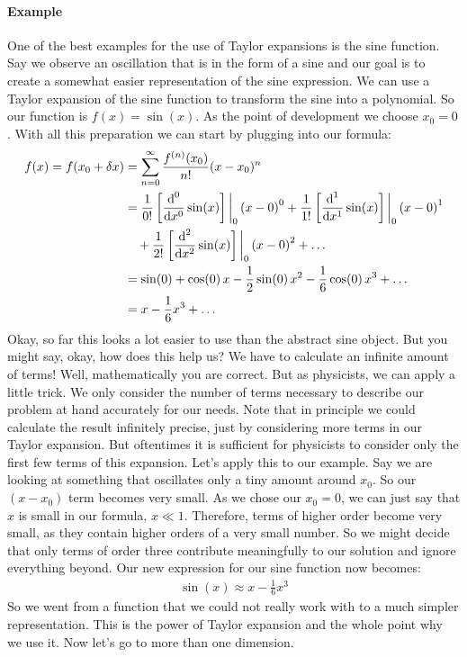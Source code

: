 \documentclass{article}
\begin{document}
	\paragraph{Example}
	One of the best examples for the use of Taylor expansions is the sine function. 
	Say we observe an oscillation that is in the form of a sine and our goal is to create a somewhat easier representation of the sine expression. We can use a Taylor expansion of the sine function to transform the sine into a polynomial. 
	So our function is $f(x)=\sin(x)$. As the point of development we choose $x_0 = 0$.
	With all this preparation we can start by plugging into our formula:
	\begin{align*}
		f(x) = f(x_0+\delta x) &= \sum_{n=0}^\infty \frac{f^{(n)}(x_0)}{n!}(x-x_0)^n \\
		&= \frac{1}{0!}\left[\frac{\text{d}^0}{\text{d}x^0} \sin(x)\right]\bigg{|}_{0}\left(x-0\right)^0 + \frac{1}{1!}\left[\frac{\text{d}^1}{\text{d}x^1} \sin(x)\right]\bigg{|}_{0}\left(x-0\right)^1 \\
		&\quad + \frac{1}{2!}\left[\frac{\text{d}^2}{\text{d}x^2} \sin(x) \right]\bigg{|}_{0}\left(x-0\right)^2 + \dots\\
		&=\sin(0) + \cos(0)\, x -\frac{1}{2}\sin(0)\, x^2 - \frac{1}{6} \cos(0)\, x^3 + \dots \\
		&=x-\frac{1}{6}x^3+\dots
	\end{align*}
	Okay, so far this looks a lot easier to use than the abstract sine object. But you might say, okay, how does this help us? We have to calculate an infinite amount of terms! Well, mathematically you are correct. But as physicists, we can apply a little trick. We only consider the number of terms necessary to describe our problem at hand accurately for our needs. Note that in principle we could calculate the result infinitely precise, just by considering more terms in our Taylor expansion. But oftentimes it is sufficient for physicists to consider only the first few terms of this expansion. Let's apply this to our example. Say we are looking at something that oscillates only a tiny amount around $x_0$. So our $\left(x-x_0\right)$ term becomes very small. As we chose our $x_0=0$, we can just say that $x$ is small in our formula, $x \ll 1$. Therefore, terms of higher order become very small, as they contain higher orders of a very small number. So we might decide that only terms of order three contribute meaningfully to our solution and ignore everything beyond. 
	Our new expression for our sine function now becomes:
	\begin{align}
		\sin(x) \approx x- \frac{1}{6} x^3
	\end{align}
	So we went from a function that we could not really work with to a much simpler representation. This is the power of Taylor expansion and the whole point why we use it. 
	Now let's go to more than one dimension.
	
\end{document}
